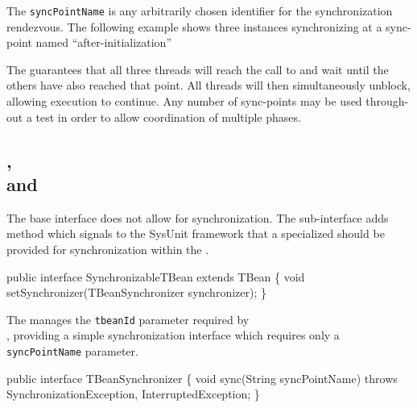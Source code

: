 The \texttt{syncPointName} is any arbitrarily chosen identifier
for the synchronization rendezvous.  The following example shows
three  instances synchronizing at a sync-point
named ``after-initialization''


The  guarantees that all three threads will
reach the call to  and wait until the others
have also reached that point.  All threads will then simultaneously
unblock, allowing execution to continue.
Any number of sync-points may be used through-out a test in order
to allow coordination of multiple phases.

\subsection{,
\\
and }

The base  interface does not allow for synchronization. The
 sub-interface  adds
 method which
signals to the SysUnit framework that a specialized 
should be provided for synchronization within the . 

\begin{codelisting}
public interface SynchronizableTBean
    extends TBean 
\{
    void setSynchronizer(TBeanSynchronizer synchronizer);
\}
\end{codelisting}

The  manages the \texttt{tbeanId}
parameter required by \\ , providing
a simple synchronization interface which requires only a
\texttt{syncPointName} parameter.

\begin{codelisting}
public interface TBeanSynchronizer
\{
    void sync(String syncPointName)
        throws SynchronizationException, InterruptedException;
\}
\end{codelisting}

